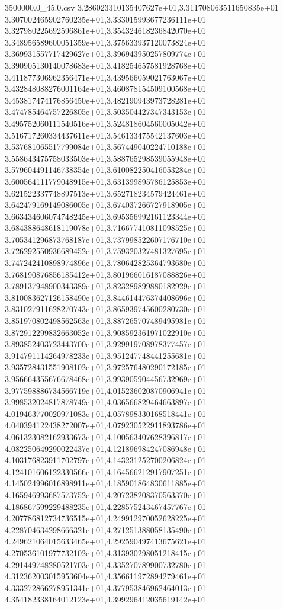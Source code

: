 \begin{filecontents*}{3500000.0_45.0.csv}
3.286023310135407627e+01,3.311708063511650835e+01
3.307002465902760235e+01,3.333015993677236111e+01
3.327980225692596861e+01,3.354324618236842070e+01
3.348956589600051359e+01,3.375633937120073824e+01
3.369931557717429627e+01,3.396943950257809774e+01
3.390905130140078683e+01,3.418254657581928768e+01
3.411877306962356471e+01,3.439566059021763067e+01
3.432848088276001164e+01,3.460878154509100568e+01
3.453817474176856450e+01,3.482190943973728281e+01
3.474785464757226805e+01,3.503504427347343153e+01
3.495752060111540516e+01,3.524818604560005042e+01
3.516717260334437611e+01,3.546133475542137603e+01
3.537681065517799084e+01,3.567449040224710188e+01
3.558643475758033503e+01,3.588765298539055948e+01
3.579604491146738354e+01,3.610082250416053284e+01
3.600564111779048915e+01,3.631399895786125853e+01
3.621522337748897513e+01,3.652718234579424461e+01
3.642479169149086005e+01,3.674037266727918905e+01
3.663434606074748245e+01,3.695356992161123344e+01
3.684388648618119078e+01,3.716677410811098525e+01
3.705341296873768187e+01,3.737998522607176710e+01
3.726292550936689452e+01,3.759320327481327695e+01
3.747242410898974896e+01,3.780642825364793680e+01
3.768190876856185412e+01,3.801966016187088826e+01
3.789137948900343389e+01,3.823289899880182929e+01
3.810083627126158490e+01,3.844614476374408696e+01
3.831027911628270743e+01,3.865939745600280730e+01
3.851970802498562563e+01,3.887265707489495981e+01
3.872912299832663052e+01,3.908592361971022910e+01
3.893852403723443700e+01,3.929919708978377457e+01
3.914791114264978233e+01,3.951247748441255681e+01
3.935728431551908102e+01,3.972576480290172185e+01
3.956664355676678468e+01,3.993905904456732969e+01
3.977598886734566719e+01,4.015236020870906941e+01
3.998532024817878749e+01,4.036566829464663897e+01
4.019463770020971083e+01,4.057898330168518441e+01
4.040394122438272007e+01,4.079230522911893786e+01
4.061323082162933673e+01,4.100563407628396817e+01
4.082250649290022437e+01,4.121896984247086948e+01
4.103176823911702797e+01,4.143231252700206824e+01
4.124101606122330566e+01,4.164566212917907251e+01
4.145024996016898911e+01,4.185901864830611885e+01
4.165946993687573752e+01,4.207238208370563370e+01
4.186867599229488235e+01,4.228575243467457767e+01
4.207786812734736515e+01,4.249912970052628225e+01
4.228704634298666321e+01,4.271251388058135490e+01
4.249621064015633465e+01,4.292590497413675621e+01
4.270536101977732102e+01,4.313930298051218415e+01
4.291449748280521703e+01,4.335270789900732780e+01
4.312362003015953604e+01,4.356611972894279461e+01
4.333272866278951341e+01,4.377953846962464013e+01
4.354182338164012123e+01,4.399296412035619142e+01

\end{filecontents*}
